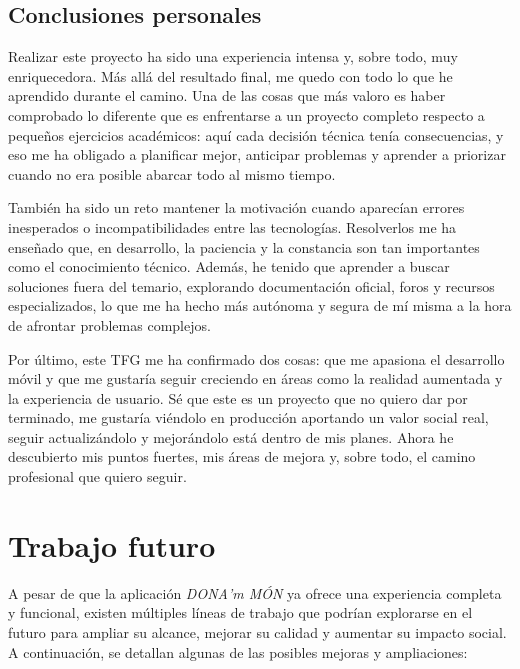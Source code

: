 \subsection{Conclusiones personales}

Realizar este proyecto ha sido una experiencia intensa y, sobre todo, muy enriquecedora. Más allá del resultado final, me quedo con todo lo que he aprendido durante el camino. Una de las cosas que más valoro es haber comprobado lo diferente que es enfrentarse a un proyecto completo respecto a pequeños ejercicios académicos: aquí cada decisión técnica tenía consecuencias, y eso me ha obligado a planificar mejor, anticipar problemas y aprender a priorizar cuando no era posible abarcar todo al mismo tiempo.

También ha sido un reto mantener la motivación cuando aparecían errores inesperados o incompatibilidades entre las tecnologías. Resolverlos me ha enseñado que, en desarrollo, la paciencia y la constancia son tan importantes como el conocimiento técnico. Además, he tenido que aprender a buscar soluciones fuera del temario, explorando documentación oficial, foros y recursos especializados, lo que me ha hecho más autónoma y segura de mí misma a la hora de afrontar problemas complejos.

Por último, este TFG me ha confirmado dos cosas: que me apasiona el desarrollo móvil y que me gustaría seguir creciendo en áreas como la realidad aumentada y la experiencia de usuario. Sé que este es un proyecto que no quiero dar por terminado, me gustaría viéndolo en producción aportando un valor social real, seguir actualizándolo y mejorándolo está dentro de mis planes.  Ahora he descubierto mis puntos fuertes, mis áreas de mejora y, sobre todo, el camino profesional que quiero seguir.


\section{Trabajo futuro}

A pesar de que la aplicación \textit{DONA'm MÓN} ya ofrece una experiencia completa y funcional, existen múltiples líneas de trabajo que podrían explorarse en el futuro para ampliar su alcance, mejorar su calidad y aumentar su impacto social. A continuación, se detallan algunas de las posibles mejoras y ampliaciones:

